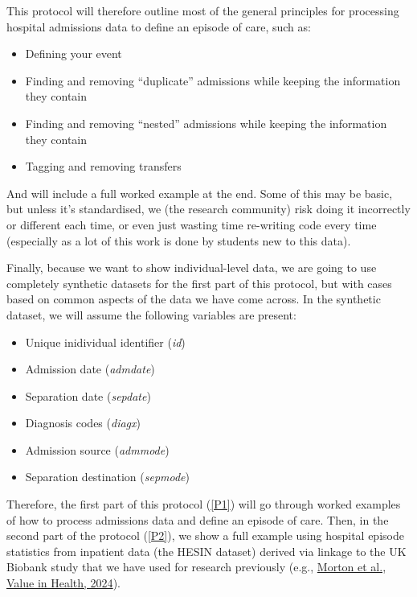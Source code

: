 \documentclass[11pt]{article}
\begin{document}
This protocol will therefore outline most of the general principles for processing hospital admissions data
to define an episode of care, such as:
\begin{itemize}
\item Defining your event
\item Finding and removing ``duplicate'' admissions while keeping the information they contain
\item Finding and removing ``nested'' admissions while keeping the information they contain
\item Tagging and removing transfers
\end{itemize}

And will include a full worked example at the end. 
Some of this may be basic, but unless it's standardised, we (the research community) 
risk doing it incorrectly or different each time, 
or even just wasting time re-writing code every time 
(especially as a lot of this work is done by students new to this data). 

Finally, because we want to show individual-level data, we are going to use 
completely synthetic datasets for the first
part of this protocol,
but with cases based on common aspects of the data we have come across. 
In the synthetic dataset, we will assume the following variables are present:
\begin{itemize}
\item Unique inidividual identifier (\emph{id})
\item Admission date (\emph{admdate})
\item Separation date  (\emph{sepdate})
\item Diagnosis codes (\emph{diagx})
\item Admission source (\emph{admmode})
\item Separation destination (\emph{sepmode})
\end{itemize}

Therefore, the first part of this protocol (\ref{P1}) will go through worked examples
of how to process admissions data and define an episode of care. 
Then, in the second part of the protocol (\ref{P2}), we show a full example
using hospital episode statistics from inpatient data (the HESIN dataset) derived via 
linkage to the UK Biobank study that we have used for research previously (e.g., 
\color{blue} \color{blue}
\href{https://www.valueinhealthjournal.com/article/S1098-3015(24)02791-8/fulltext}{Morton et al., Value in Health, 2024}\color{black}).
\end{document}
